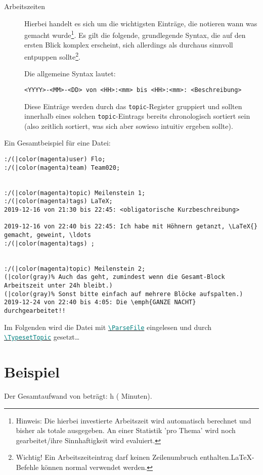 \documentclass{article}
\def\cmd#1{\texttt{\textcolor{teal}{\textbackslash#1}}}
\def\cmdref#1{\hyperref[cmd:#1]{\cmd{#1}}}
\begin{document}
\begin{description}
    \item[Arbeitszeiten] Hierbei handelt es sich um die wichtigsten Einträge, die notieren wann was gemacht wurde\footnote{Hinweis: Die hierbei investierte Arbeitszeit wird automatisch berechnet und bisher als totale ausgegeben. An einer Statistik 'pro Thema' wird noch gearbeitet/ihre Sinnhaftigkeit wird evaluiert.}. Es gilt die folgende, grundlegende Syntax, die auf den ersten Blick komplex erscheint, sich allerdings als durchaus sinnvoll entpuppen sollte\footnote{Wichtig! Ein Arbeitszeiteintrag darf keinen Zeilenumbruch enthalten.\LaTeX-Befehle können normal verwendet werden.}.\par{} Die allgemeine Syntax lautet:
\begin{Verbatim}
<YYYY>-<MM>-<DD> von <HH>:<mm> bis <HH>:<mm>: <Beschreibung>
\end{Verbatim}
          Diese Einträge werden durch das \texttt{topic}-Register gruppiert und sollten innerhalb eines solchen \texttt{topic}-Eintrags bereits chronologisch sortiert sein (also zeitlich sortiert, was sich aber sowieso intuitiv ergeben sollte).
\end{description}

Ein Gesamtbeispiel für eine Datei:
\begin{Verbatim}[label=\fbox{\color{black}example.def}]
:/(|color(magenta)user) Flo;
:/(|color(magenta)team) Team020;


:/(|color(magenta)topic) Meilenstein 1;
:/(|color(magenta)tags) LaTeX;
2019-12-16 von 21:30 bis 22:45: <obligatorische Kurzbeschreibung>

2019-12-16 von 22:40 bis 22:45: Ich habe mit Höhnern getanzt, \LaTeX{} gemacht, geweint, \ldots
:/(|color(magenta)tags) ;


:/(|color(magenta)topic) Meilenstein 2;
(|color(gray)% Auch das geht, zumindest wenn die Gesamt-Block Arbeitszeit unter 24h bleibt.)
(|color(gray)% Sonst bitte einfach auf mehrere Blöcke aufspalten.)
2019-12-24 von 22:40 bis 4:05: Die \emph{GANZE NACHT} durchgearbeitet!!
\end{Verbatim}

Im Folgenden wird die Datei mit \cmdref{ParseFile} eingelesen und durch \cmdref{TypesetTopic} gesetzt\ldots

\section{Beispiel}
Der Gesamtaufwand von  beträgt:
h ( Minuten).
\end{document}

